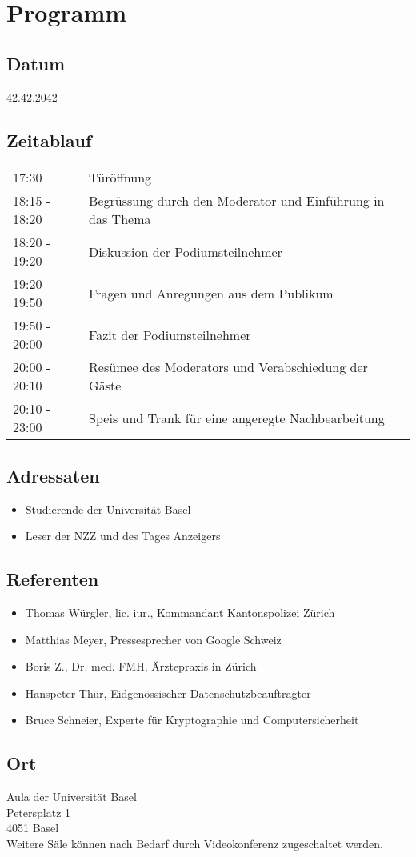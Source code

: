 \section{Programm}
\subsection*{Datum}
42.42.2042

\subsection*{Zeitablauf}
\begin{tabular}{ll}
17:30	& T\"ur\"offnung\\
18:15 - 18:20 & Begr\"ussung durch den Moderator und Einf\"uhrung in das Thema\\
18:20 - 19:20 & Diskussion der Podiumsteilnehmer\\
19:20 - 19:50 & Fragen und Anregungen aus dem Publikum\\
19:50 - 20:00 & Fazit der Podiumsteilnehmer\\ %
20:00 - 20:10 & Res\"umee des Moderators und Verabschiedung der G\"aste\\ %
20:10 - 23:00 & Speis und Trank f\"ur eine angeregte Nachbearbeitung\\
\end{tabular}

\subsection*{Adressaten}
\begin{itemize}
 \item Studierende der Universit\"at Basel
 \item Leser der NZZ und des Tages Anzeigers
\end{itemize}


\subsection*{Referenten}
\begin{itemize}
\item Thomas W\"urgler, lic. iur., Kommandant Kantonspolizei Z\"urich
\item Matthias Meyer, Pressesprecher von Google Schweiz
\item Boris Z., Dr. med. FMH, \"Arztepraxis in Z\"urich
\item Hanspeter Th\"ur, Eidgen\"ossischer Datenschutzbeauftragter
\item Bruce Schneier, Experte f\"ur Kryptographie und Computersicherheit
\end{itemize}

\subsection*{Ort}
Aula der Universit\"at Basel\\
Petersplatz 1\\
4051 Basel\\
\newline
Weitere S\"ale k\"onnen nach Bedarf durch Videokonferenz zugeschaltet werden.
